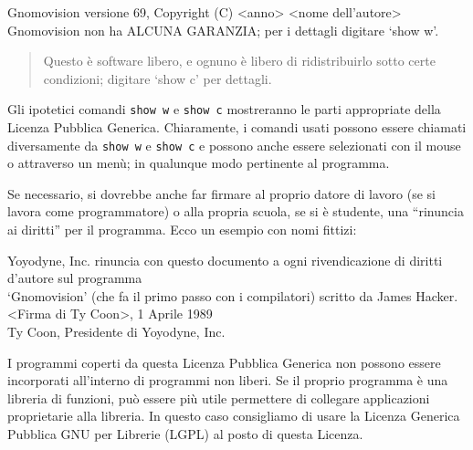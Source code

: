 \begin{center}
  Gnomovision versione 69, Copyright (C) <anno> <nome
  dell'autore> \\
  Gnomovision non ha ALCUNA GARANZIA; per i dettagli
  digitare `show w'.
\end{center}
\begin{quote}
  Questo \`e software libero, e ognuno \`e libero di
  ridistribuirlo sotto certe condizioni; digitare `show c'
  per dettagli.
\end{quote}

Gli ipotetici comandi \texttt{show w} e \texttt{show c}
mostreranno le parti appropriate della Licenza Pubblica
Generica. Chiaramente, i comandi usati possono essere
chiamati diversamente da \texttt{show w} e \texttt{show c} e
possono anche essere selezionati con il mouse o attraverso
un men\`u; in qualunque modo pertinente al programma.

Se necessario, si dovrebbe anche far firmare al proprio
datore di lavoro (se si lavora come programmatore) o alla
propria scuola, se si \`e studente, una ``rinuncia ai
diritti'' per il programma. Ecco un esempio con nomi
fittizi:

\begin{center}
  Yoyodyne, Inc. rinuncia con questo documento a ogni
  rivendicazione di diritti d'autore sul programma \\
  `Gnomovision' (che fa il primo passo con i compilatori)
  scritto da James Hacker. \\[1ex]
  <Firma di Ty Coon>, 1 Aprile 1989 \\
  Ty Coon, Presidente di Yoyodyne, Inc.
\end{center}

I programmi coperti da questa Licenza Pubblica Generica non
possono essere incorporati all'interno di programmi non
liberi. Se il proprio programma \`e una libreria di
funzioni, pu\`o essere pi\`u utile permettere di collegare
applicazioni proprietarie alla libreria. In questo caso
consigliamo di usare la Licenza Generica Pubblica GNU per
Librerie (LGPL) al posto di questa Licenza.

\endinput
